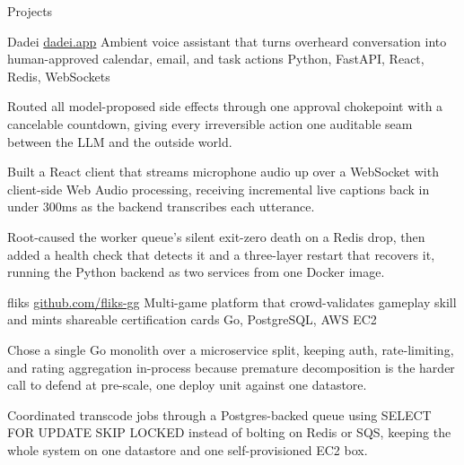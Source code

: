 \documentclass[
	11pt
]{../../../template}
\begin{document}
	\begin{rSection}{P}{rojects}
		\begin{rSectionEntry}
			{Dadei}
			{\href{https://dadei.app}{dadei.app}}
			{Ambient voice assistant that turns overheard conversation into human-approved calendar, email, and task actions}
			{Python, FastAPI, React, Redis, WebSockets}
			{}

			\item Routed all model-proposed side effects through one approval chokepoint with a cancelable countdown, giving every irreversible action one auditable seam between the LLM and the outside world.
			\item Built a React client that streams microphone audio up over a WebSocket with client-side Web Audio processing, receiving incremental live captions back in under 300ms as the backend transcribes each utterance.
			\item Root-caused the worker queue's silent exit-zero death on a Redis drop, then added a health check that detects it and a three-layer restart that recovers it, running the Python backend as two services from one Docker image.
		\end{rSectionEntry}

		\begin{rSectionEntry}
			{fliks}
			{\href{https://github.com/fliks-gg}{github.com/fliks-gg}}
			{Multi-game platform that crowd-validates gameplay skill and mints shareable certification cards}
			{Go, PostgreSQL, AWS EC2}
			{}

			\item Chose a single Go monolith over a microservice split, keeping auth, rate-limiting, and rating aggregation in-process because premature decomposition is the harder call to defend at pre-scale, one deploy unit against one datastore.
			\item Coordinated transcode jobs through a Postgres-backed queue using SELECT FOR UPDATE SKIP LOCKED instead of bolting on Redis or SQS, keeping the whole system on one datastore and one self-provisioned EC2 box.
		\end{rSectionEntry}
	\end{rSection}
\end{document}
